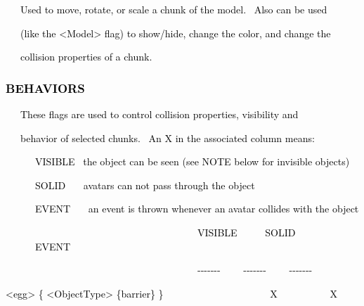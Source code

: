 \documentclass[a4paper]{article}
\newcommand\textstyleOOoComputerKeyWord[1]{\textrm{\textcolor[rgb]{0.0,0.0,0.5019608}{#1}}}
\begin{document}
\bigskip

{\color{black}
\textstyleOOoComputerKeyWord{\textcolor{black}{\ \ \ Used to move, rotate, or scale a chunk of the model. \ Also can be
used}}}

{\color{black}
\textstyleOOoComputerKeyWord{\textcolor{black}{\ \ \ (like the {\textless}Model{\textgreater} flag) to show/hide, change
the color, and change the}}}

{\color{black}
\textstyleOOoComputerKeyWord{\textcolor{black}{\ \ \ collision properties of a chunk.}}}


\bigskip


\bigskip

\subsubsection[BEHAVIORS]{\textstyleOOoComputerKeyWord{\textcolor{black}{BEHAVIORS}}}
\hypertarget{RefHeading7916869075401}{}
\bigskip

{\color{black}
\textstyleOOoComputerKeyWord{\textcolor{black}{\ \ \ These flags are used to control collision properties, visibility
and}}}

{\color{black}
\textstyleOOoComputerKeyWord{\textcolor{black}{\ \ \ behavior of selected chunks. \ An {\textquotedbl}X{\textquotedbl}
in the associated column means:}}}


\bigskip

{\color{black}
\textstyleOOoComputerKeyWord{\textcolor{black}{\ \ \ \ \ \ VISIBLE \ the object can be seen (see NOTE below for
invisible objects)}}}

{\color{black}
\textstyleOOoComputerKeyWord{\textcolor{black}{\ \ \ \ \ \ SOLID \ \ \ avatars can not pass through the object}}}

{\color{black}
\textstyleOOoComputerKeyWord{\textcolor{black}{\ \ \ \ \ \ EVENT \ \ \ an event is thrown whenever an avatar collides
with the object}}}


\bigskip

{\color{black}
\textstyleOOoComputerKeyWord{\textcolor{black}{\ \ \ \ \ \ \ \ \ \ \ \ \ \ \ \ \ \ \ \ \ \ \ \ \ \ \ \ \ \ \ \ \ \ \ \ \ \ \ VISIBLE
\ \ \ \ \ SOLID \ \ \ \ \ \ EVENT}}}

{\color{black}
\textstyleOOoComputerKeyWord{\textcolor{black}{\ \ \ \ \ \ \ \ \ \ \ \ \ \ \ \ \ \ \ \ \ \ \ \ \ \ \ \ \ \ \ \ \ \ \ \ \ \ \ {}-{}-{}-{}-{}-{}-{}-
\ \ \ \ {}-{}-{}-{}-{}-{}-{}- \ \ \ \ {}-{}-{}-{}-{}-{}-{}-}}}

{\color{black}
\textstyleOOoComputerKeyWord{\textcolor{black}{{\textless}egg{\textgreater} \{ {\textless}ObjectType{\textgreater}
\{barrier\} \} \ \ \ \ \ \ \ \ \ \ \ \ \ \ \ \ \ \ \ \ \ X \ \ \ \ \ \ \ \ \ \ X}}}
\end{document}
